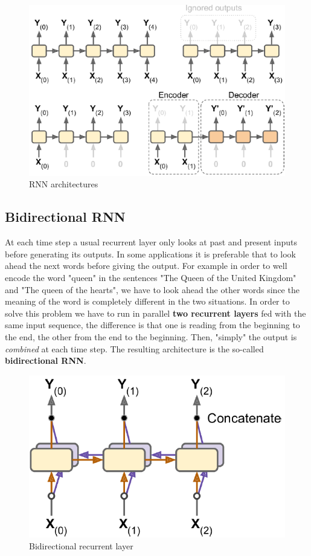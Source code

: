 \begin{figure}[h] 
    \centering
    \label{fig:RNN_archs}   
    \includegraphics[scale=0.5]{img/rnn_archs.png}
    \caption{RNN architectures}
\end{figure}

\vspace{-1cm}
\subsection{Bidirectional RNN}
At each time step a usual recurrent layer only looks at past and present inputs before generating its outputs. In some applications it is preferable that to look ahead the next words before giving the output. For example in order to well encode the word "queen" in the sentences "The Queen of the United Kingdom" and "The queen of the hearts", we have to look ahead the other words since the meaning of the word is completely different in the two situations. In order to solve this problem we have to run in parallel \textbf{two recurrent layers} fed with the same input sequence, the difference is that one is reading from the beginning to the end, the other from the end to the beginning. Then, "simply" the output is \textit{combined} at each time step. The resulting architecture is the so-called \textbf{bidirectional RNN}.

\begin{figure}[h]
    \centering
    \includegraphics[scale=0.5]{img/rnn_bidir.png}
    \caption{Bidirectional recurrent layer}
\end{figure}

